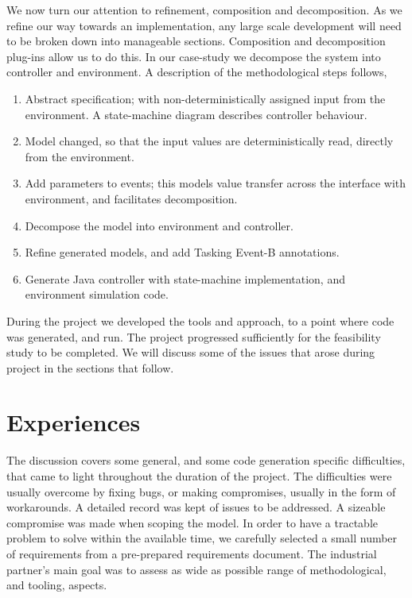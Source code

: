 \documentclass{llncs}%
\begin{document}
We now turn our attention to refinement, composition and decomposition. As we refine our way towards an implementation, any large scale development will need to be broken down into manageable sections. Composition and decomposition~\cite{decomp2010c} plug-ins allow us to do this. In our case-study we decompose the system into controller and environment. A description of the methodological steps follows, 
%
\begin{enumerate}[noitemsep]
\item Abstract specification; with non-deterministically assigned input from the environment. A state-machine diagram describes controller behaviour.
\item Model changed, so that the input values are deterministically read, directly from the environment.
\item Add parameters to events; this models value transfer across the interface with environment, and facilitates decomposition.
\item Decompose the model into environment and controller.
\item Refine generated models, and add Tasking Event-B annotations.
\item Generate Java controller with state-machine implementation, and environment simulation code.
\end{enumerate}
%
During the project we developed the tools and approach, to a point where code was generated, and run. The project progressed sufficiently for the feasibility study to be completed. We will discuss some of the issues that arose during project in the sections that follow.
%
%
\section{Experiences}\label{Experience}
The discussion covers some general, and some code generation specific difficulties, that came to light throughout the duration of the project. The difficulties were usually overcome by fixing bugs, or making compromises, usually in the form of workarounds. A detailed record was kept of issues to be addressed. A sizeable compromise was made when scoping the model. In order to have a tractable problem to solve within the available time, we carefully selected a small number of requirements from a pre-prepared requirements document. The industrial partner's main goal was to assess as wide as possible range of methodological, and tooling, aspects. 
\end{document}

